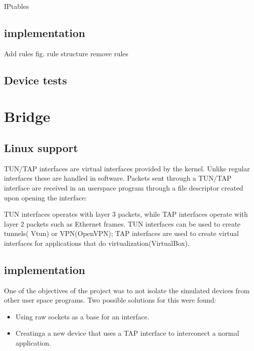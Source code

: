 IPtables

\subsection{\text{\project} implementation}
\label{sub-sec:firewall-lkl}

Add rules
fig. rule structure
remove rules

\subsection{Device tests}
\label{sub-sec:firewall-tests}

\section{Bridge}

\subsection{Linux support}
\label{sub-sec:bridge-lin}

TUN/TAP interfaces are virtual interfaces provided by the kernel. Unlike regular interfaces
these are handled in software. Packets sent through a TUN/TAP interface are received in
an userspace program through a file descriptor created upon opening the interface: 

\lstset{language=C,caption=Opening a tun/tap interface,label=lst:tapopen}


TUN interfaces operates with layer 3 packets, while TAP interfaces operate with layer 
2 packets such as Ethernet frames. TUN interfaces can be used to create tunnels( Vtun)
or VPN(OpenVPN); TAP interfaces are used to create virtual interfaces for applications 
that do virtualization(VirtualBox).

\subsection{\text{\project} implementation}
\label{sub-sec:bridge-lkl}

One of the objectives of the project was to not isolate the simulated devices from other user space 
programs. Two possible solutions for this were found:
\begin{itemize}
  \item Using raw sockets as a base for an interface.
  \item Creatinga a new device that uses a TAP interface to interconect a normal application.
\end{itemize}

